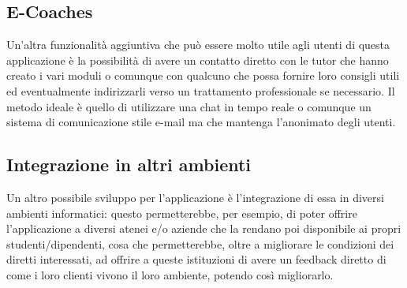 \subsection{E-Coaches}
Un'altra funzionalità aggiuntiva che può essere molto utile agli utenti di questa applicazione è la possibilità di avere un contatto diretto con le tutor che hanno creato i vari moduli o comunque con qualcuno che possa fornire loro consigli utili ed eventualmente indirizzarli verso un trattamento professionale se necessario. Il metodo ideale è quello di utilizzare una chat in tempo reale o comunque un sistema di comunicazione stile e-mail ma che mantenga l'anonimato degli utenti.

\subsection{Integrazione in altri ambienti}
Un altro possibile sviluppo per l'applicazione è l'integrazione di essa in diversi ambienti informatici: questo permetterebbe, per esempio, di poter offrire l'applicazione a diversi atenei e/o aziende che la rendano poi disponibile ai propri studenti/dipendenti, cosa che permetterebbe, oltre a migliorare le condizioni dei diretti interessati, ad offrire a queste istituzioni di avere un feedback diretto di come i loro clienti vivono il loro ambiente, potendo così migliorarlo.
\newpage\null\thispagestyle{empty}\newpage